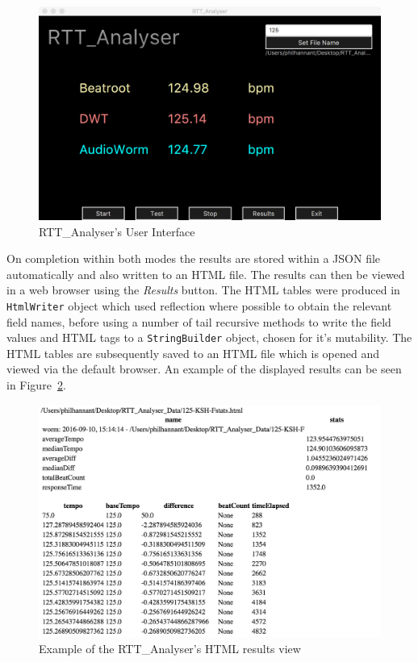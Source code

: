 \documentclass[a4paper, 11pt]{article}
\begin{document}
\begin{figure}[h]
\centering
\includegraphics[scale=0.25]{images/rtt.jpg}
\caption{RTT\_Analyser's User Interface}
\label{fig: rtt}
\end{figure}

On completion within both modes the results are stored within a JSON file automatically and also written to an HTML file. The results can then be viewed in a web browser using the \textit{Results} button. The HTML tables were produced in \texttt{HtmlWriter} object which used reflection where possible to obtain the relevant field names, before using a number of tail recursive methods to write the field values and HTML tags to a \texttt{StringBuilder} object, chosen for it's mutability. The HTML tables are subsequently saved to an HTML file which is opened and viewed via the default browser. An example of the displayed results can be seen in Figure~\ref{fig: htmlView}.

\begin{figure}[htbp]
\centering
\includegraphics[scale=0.3]{images/htmlResults.jpg}
\caption{Example of the RTT\_Analyser's HTML results view}
\label{fig: htmlView}
\end{figure}
\end{document}
